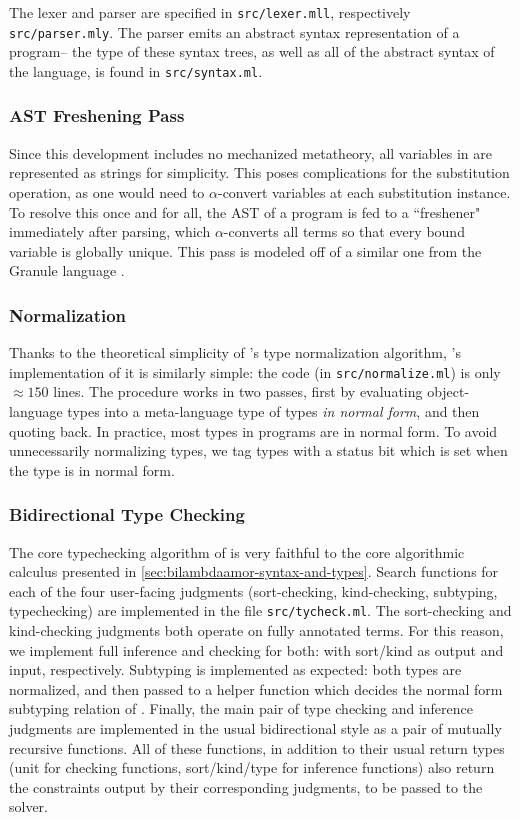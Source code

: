 The lexer and parser are specified in \texttt{src/lexer.mll}, respectively \texttt{src/parser.mly}. The parser emits an abstract syntax representation of a program-- the type of these syntax trees, as well as all of the abstract syntax of the language, is found in \texttt{src/syntax.ml}.


\subsubsection{AST Freshening Pass}
Since this development includes no mechanized metatheory, all variables in \lambdaamorimpl are represented as strings for simplicity. This poses complications for the substitution operation, as one would need to $\alpha$-convert variables at each substitution instance. To resolve this once and for all, the AST of a program is fed to a ``freshener" immediately after parsing, which $\alpha$-converts all terms so that every bound variable is globally unique. This pass is modeled off of a similar one from the Granule language \cite{orchard-et-al:popl19}.

\subsubsection{Normalization}
Thanks to the theoretical simplicity of \lambdaamor's type normalization algorithm, \lambdaamorimpl's implementation of it is similarly simple: the code (in \texttt{src/normalize.ml}) is only $\approx 150$ lines. The procedure works in two passes, first by evaluating object-language types into a meta-language type of types \textit{in normal form}, and then quoting back. In practice, most types in \lambdaamor programs are in normal form. To avoid unnecessarily normalizing types, we tag types with a status bit which is set when the type is in normal form.

\subsubsection{Bidirectional Type Checking}
The core typechecking algorithm of \lambdaamorimpl is very faithful to the core algorithmic calculus presented in \autoref{sec:bilambdaamor-syntax-and-types}. Search functions for each of the four user-facing judgments (sort-checking, kind-checking, subtyping, typechecking) are implemented in the file \texttt{src/tycheck.ml}. The sort-checking and kind-checking judgments both operate on fully annotated terms. For this reason, we implement full inference and checking for both: with sort/kind as output and input, respectively. Subtyping is implemented as expected: both types are normalized, and then passed to a helper function which decides the normal form subtyping relation of \bilambdaamor. Finally, the main pair of type checking and inference judgments are implemented in the usual bidirectional style as a pair of mutually recursive functions. All of these functions, in addition to their usual return types (unit for checking functions, sort/kind/type for inference functions) also return the constraints output by their corresponding judgments, to be passed to the solver.

